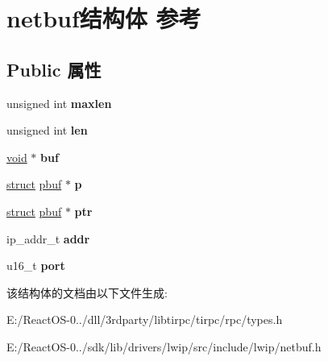 \hypertarget{structnetbuf}{}\section{netbuf结构体 参考}
\label{structnetbuf}
\subsection*{Public 属性}
\begin{DoxyCompactItemize}
\item 
\mbox{\label{structnetbuf_aa9b64dd9bf5cc76a73c8d1567728b05d}} 
unsigned int {\bfseries maxlen}
\item 
\mbox{\label{structnetbuf_a69982bde3dd60240e114e16fb51253d7}} 
unsigned int {\bfseries len}
\item 
\mbox{\label{structnetbuf_a394df40fc7b71b5dcddcab9dc604e1da}} 
\hyperlink{interfacevoid}{void} $\ast$ {\bfseries buf}
\item 
\mbox{\label{structnetbuf_ae0c3ba45f7e26a90585c8d79d59c41bd}} 
\hyperlink{interfacestruct}{struct} \hyperlink{structpbuf}{pbuf} $\ast$ {\bfseries p}
\item 
\mbox{\label{structnetbuf_a2301ad2b03edfb74049a2b0ef6cd2cd5}} 
\hyperlink{interfacestruct}{struct} \hyperlink{structpbuf}{pbuf} $\ast$ {\bfseries ptr}
\item 
\mbox{\label{structnetbuf_a36d0b956d15d9eea205055e227143856}} 
ip\+\_\+addr\+\_\+t {\bfseries addr}
\item 
\mbox{\label{structnetbuf_ac7a45470930d48463b039af4bf464fc4}} 
u16\+\_\+t {\bfseries port}
\end{DoxyCompactItemize}


该结构体的文档由以下文件生成\+:\begin{DoxyCompactItemize}
\item 
E\+:/\+React\+O\+S-\/0../dll/3rdparty/libtirpc/tirpc/rpc/types.\+h\item 
E\+:/\+React\+O\+S-\/0../sdk/lib/drivers/lwip/src/include/lwip/netbuf.\+h\end{DoxyCompactItemize}
